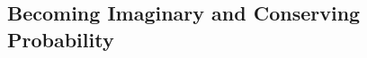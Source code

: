 \documentclass{book}
\theoremstyle{definition}
\begin{document}
\subsection{Becoming Imaginary and Conserving Probability}


































































												










































\newpage
\end{document}
